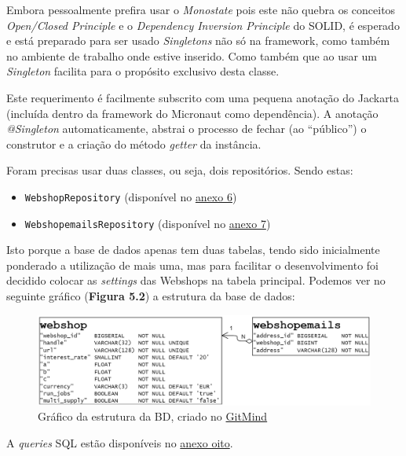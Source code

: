 Embora pessoalmente prefira usar o \textit{Monostate} pois este não quebra os conceitos \textit{Open/Closed Principle} e o \textit{Dependency Inversion Principle} do SOLID, é esperado e está preparado para ser usado \textit{Singletons} não só na framework, como também no ambiente de trabalho onde estive inserido. Como também que ao usar um \textit{Singleton} facilita para o propósito exclusivo desta classe.

Este requerimento é facilmente subscrito com uma pequena anotação do Jackarta (incluída dentro da framework do Micronaut como dependência). A anotação \textit{@Singleton} automaticamente, abstrai o processo de fechar (ao ``público'') o construtor e a criação do método \textit{getter} da instância.

Foram precisas usar duas classes, ou seja, dois repositórios. Sendo estas:

\begin{itemize}
  \item \texttt{WebshopRepository} (disponível no \hyperref[an6]{anexo 6})
  \item \texttt{WebshopemailsRepository} (disponível no \hyperref[an7]{anexo 7})
\end{itemize}

Isto porque a base de dados apenas tem duas tabelas, tendo sido inicialmente ponderado a utilização de mais uma, mas para facilitar o desenvolvimento foi decidido colocar as \textit{settings} das Webshops na tabela principal. Podemos ver no seguinte gráfico (\textbf{Figura 5.2}) a estrutura da base de dados:

\begin{figure}[!hbt]
  \centering
  \includegraphics[width=15cm]{figuras/db.png}
  \caption{Gráfico da estrutura da BD, criado no \href{https://gitmind.com/app/flowchart /51b11741757}{GitMind}}
  \label{fig:db}
\end{figure}
\FloatBarrier

A \textit{queries} SQL estão disponíveis no \hyperref[an8]{anexo oito}.

\newpage